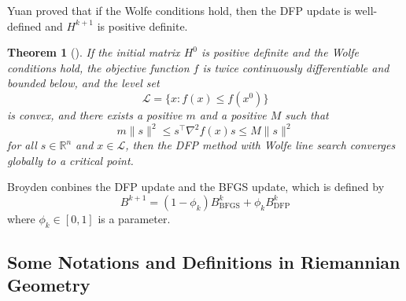 \documentclass[12pt,a4paper,draft]{article}  %
\newcounter{cite}
\newtheorem{theorem}{Theorem}[section]
\theoremstyle{definition}
\numberwithin{equation}{section}
\newcommand{\RR}{\mathbb{R}}
\begin{document}
Yuan proved that if the Wolfe conditions hold, then the DFP update is well-defined and $H^{k+1}$ is positive definite.
\begin{theorem}[\cite{Yuan1995}]\label{DFP_convergence}
        If the initial matrix $H^0$ is positive definite and the Wolfe conditions hold, the objective function $f$ is twice continuously differentiable and bounded below, and the level set $$\mathcal{L}=\{x: f(x) \leq f(x^0)\}$$ is convex, and there exists a positive $m$ and a positive $M$ such that
\begin{equation}
        m\|s\|^2 \leq s^\top \nabla^2 f(x) s \leq M \|s\|^2
\end{equation}
for all $s \in \RR^n$ and $x\in\mathcal{L}$, then the DFP method with Wolfe line search converges globally to a critical point.
\end{theorem}
Broyden conbines the DFP update and the BFGS update, which is defined by
\begin{equation}
        B^{k+1} = (1-\phi_k)B^k_{\mathrm{BFGS}} + \phi_k B^k_{\mathrm{DFP}}
\end{equation}
where $\phi_k\in [0,1]$ is a parameter. 
\subsection{Some Notations and Definitions in Riemannian Geometry}
\end{document}
